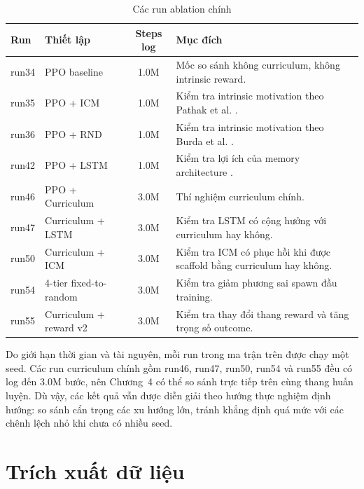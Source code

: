 \begin{table}[H]
    \centering
    \small
    \caption{Các run ablation chính}
    \label{tab:ablation_matrix_design}
    \begin{tabular}{|p{2cm}|p{5.1cm}|c|p{5.2cm}|}
        \hline
        \textbf{Run} & \textbf{Thiết lập} & \textbf{Steps log} & \textbf{Mục đích} \\
        \hline
        run34 & PPO baseline & 1.0M & Mốc so sánh không curriculum, không intrinsic reward. \\
        \hline
        run35 & PPO + ICM & 1.0M & Kiểm tra intrinsic motivation theo Pathak et al. \cite{Pathak2017}. \\
        \hline
        run36 & PPO + RND & 1.0M & Kiểm tra intrinsic motivation theo Burda et al. \cite{Burda2018}. \\
        \hline
        run42 & PPO + LSTM & 1.0M & Kiểm tra lợi ích của memory architecture \cite{Hochreiter1997}. \\
        \hline
        run46 & PPO + Curriculum & 3.0M & Thí nghiệm curriculum chính. \\
        \hline
        run47 & Curriculum + LSTM & 3.0M & Kiểm tra LSTM có cộng hưởng với curriculum hay không. \\
        \hline
        run50 & Curriculum + ICM & 3.0M & Kiểm tra ICM có phục hồi khi được scaffold bằng curriculum hay không. \\
        \hline
        run54 & 4-tier fixed-to-random & 3.0M & Kiểm tra giảm phương sai spawn đầu training. \\
        \hline
        run55 & Curriculum + reward v2 & 3.0M & Kiểm tra thay đổi thang reward và tăng trọng số outcome. \\
        \hline
    \end{tabular}
\end{table}

Do giới hạn thời gian và tài nguyên, mỗi run trong ma trận trên được chạy một seed. Các run curriculum chính gồm run46, run47, run50, run54 và run55 đều có log đến 3.0M bước, nên Chương~4 có thể so sánh trực tiếp trên cùng thang huấn luyện. Dù vậy, các kết quả vẫn được diễn giải theo hướng thực nghiệm định hướng: so sánh cẩn trọng các xu hướng lớn, tránh khẳng định quá mức với các chênh lệch nhỏ khi chưa có nhiều seed.

\section{Trích xuất dữ liệu}

